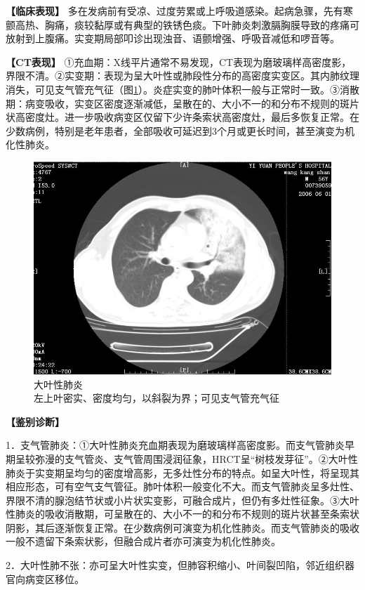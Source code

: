 \textbf{【临床表现】}
多在发病前有受凉、过度劳累或上呼吸道感染。起病急骤，先有寒颤高热、胸痛，痰较黏厚或有典型的铁锈色痰。下叶肺炎刺激膈胸膜导致的疼痛可放射到上腹痛。实变期局部叩诊出现浊音、语颤增强、呼吸音减低和啰音等。

\textbf{【CT表现】}
①充血期：X线平片通常不易发现，CT表现为磨玻璃样高密度影，界限不清。②实变期：表现为呈大叶性或肺段性分布的高密度实变区。其内肺纹理消失，可见支气管充气征（图\ref{fig9-16}）。炎症实变的肺叶体积一般与正常时一致。③消散期：病变吸收，实变区密度逐渐减低，呈散在的、大小不一的和分布不规则的斑片状高密度灶。进一步吸收病变区仅留下少许条索状高密度灶，最后多恢复正常。在少数病例，特别是老年患者，全部吸收可延迟到3个月或更长时间，甚至演变为机化性肺炎。

\begin{figure}[!htbp]
 \centering
 \includegraphics[width=.7\textwidth,height=\textheight,keepaspectratio]{./images/Image00201.jpg}
 \captionsetup{justification=centering}
 \caption{大叶性肺炎\\{\small 左上叶密实、密度均匀，以斜裂为界；可见支气管充气征}}
 \label{fig9-16}
  \end{figure} 

\textbf{【鉴别诊断】}

1．支气管肺炎：①大叶性肺炎充血期表现为磨玻璃样高密度影。而支气管肺炎早期呈较弥漫的支气管炎、支气管周围浸润征象，HRCT呈“树枝发芽征”。②大叶性肺炎于实变期呈均匀的密度增高影，无多灶性分布的特点。如呈大叶性，将呈现其相应形态，可有空气支气管征。肺叶体积一般变化不大。而支气管肺炎呈多灶性、界限不清的腺泡结节状或小片状实变影，可融合成片，但仍有多灶性征象。③大叶性肺炎的吸收消散期，可呈散在的、大小不一的和分布不规则的斑片状甚至条索状阴影，其后逐渐恢复正常。在少数病例可演变为机化性肺炎。而支气管肺炎的吸收一般不遗留下条索状影，但融合成片者亦可演变为机化性肺炎。

2．大叶性肺不张：亦可呈大叶性实变，但肺容积缩小、叶间裂凹陷，邻近组织器官向病变区移位。

